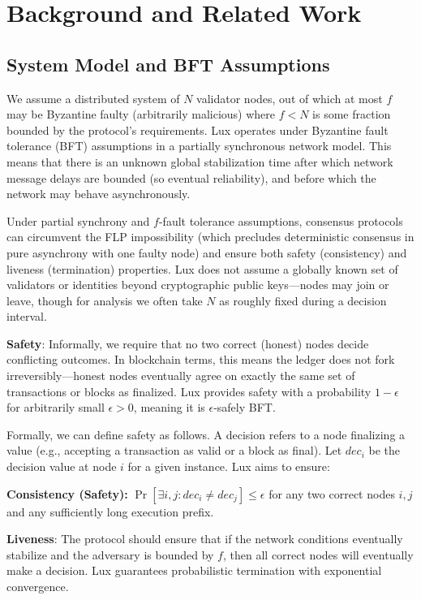 \section{Background and Related Work}

\subsection{System Model and BFT Assumptions}

We assume a distributed system of $N$ validator nodes, out of which at most $f$ may be Byzantine faulty (arbitrarily malicious) where $f < N$ is some fraction bounded by the protocol's requirements. Lux operates under Byzantine fault tolerance (BFT) assumptions in a partially synchronous network model. This means that there is an unknown global stabilization time after which network message delays are bounded (so eventual reliability), and before which the network may behave asynchronously.

Under partial synchrony and $f$-fault tolerance assumptions, consensus protocols can circumvent the FLP impossibility (which precludes deterministic consensus in pure asynchrony with one faulty node) and ensure both safety (consistency) and liveness (termination) properties. Lux does not assume a globally known set of validators or identities beyond cryptographic public keys—nodes may join or leave, though for analysis we often take $N$ as roughly fixed during a decision interval.

\textbf{Safety}: Informally, we require that no two correct (honest) nodes decide conflicting outcomes. In blockchain terms, this means the ledger does not fork irreversibly—honest nodes eventually agree on exactly the same set of transactions or blocks as finalized. Lux provides safety with a probability $1-\epsilon$ for arbitrarily small $\epsilon>0$, meaning it is $\epsilon$-safely BFT.

Formally, we can define safety as follows. A decision refers to a node finalizing a value (e.g., accepting a transaction as valid or a block as final). Let $dec_i$ be the decision value at node $i$ for a given instance. Lux aims to ensure:

\textbf{Consistency (Safety):} $\Pr[\exists i,j: dec_i \neq dec_j] \le \epsilon$ for any two correct nodes $i,j$ and any sufficiently long execution prefix.

\textbf{Liveness}: The protocol should ensure that if the network conditions eventually stabilize and the adversary is bounded by $f$, then all correct nodes will eventually make a decision. Lux guarantees probabilistic termination with exponential convergence.

